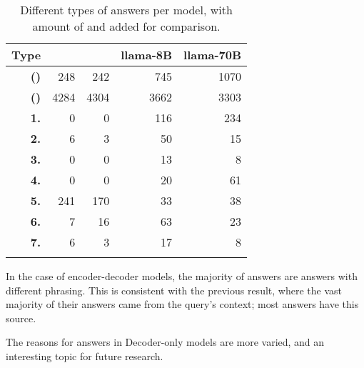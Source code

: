 \begin{table}[t]
	\caption{Different types of \Other{} answers per model, with amount of \Parametric{} and \Contextual{} added for comparison.}
	\label{other_results_category}
	\centering
	\footnotesize
	\begin{tabular}{>{\bfseries}r | r r r r}
		\toprule
			\bfseries Type & \ttfamily\scriptsize \smallflan{} & \ttfamily\scriptsize \bigflan{} & \ttfamily\scriptsize llama-8B & \ttfamily\scriptsize llama-70B \\
		\midrule
			(\Pc{}) & 248 & 242 & 745 & 1070 \\
			(\Cc{}) & 4284 & 4304 & 3662 & 3303 \\
		\midrule
			1. & 0 & 0 & 116 & 234 \\
			2. & 6 & 3 & 50 & 15 \\
			3. & 0 & 0 & 13 & 8 \\
			4. & 0 & 0 & 20 & 61 \\
			5. & 241 & 170 & 33 & 38 \\
			6. & 7 & 16 & 63 & 23 \\
			7. & 6 & 3 & 17 & 8 \\
		\bottomrule \addlinespace[4pt]
	\end{tabular}
\end{table}


In the case of encoder-decoder models, the majority of \Other{} answers are \Contextual{} answers with different phrasing.
This is consistent with the previous result, where the vast majority of their answers came from the query's context; most \Other{} answers have this source.

The reasons for \Other{} answers in Decoder-only models are more varied, and an interesting topic for future research.

